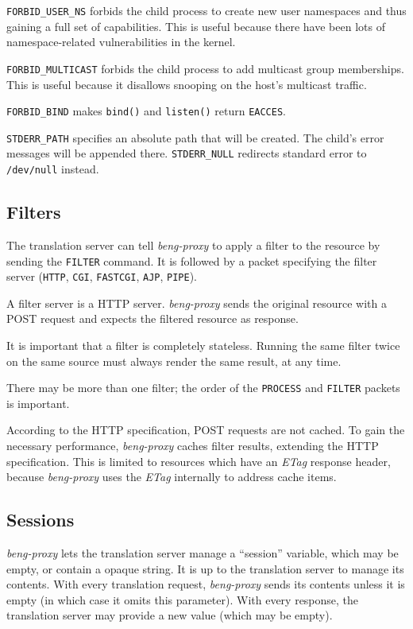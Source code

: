 \documentclass[a4paper,12pt]{article}
\begin{document}
\verb|FORBID_USER_NS| forbids the child process to create new user
namespaces and thus gaining a full set of capabilities.  This is
useful because there have been lots of namespace-related
vulnerabilities in the kernel.

\verb|FORBID_MULTICAST| forbids the child process to add multicast
group memberships.  This is useful because it disallows snooping on
the host's multicast traffic.

\verb|FORBID_BIND| makes \verb|bind()| and \verb|listen()| return
\verb|EACCES|.

\verb|STDERR_PATH| specifies an absolute path that will be created.
The child's error messages will be appended there.  \verb|STDERR_NULL|
redirects standard error to \texttt{/dev/null} instead.

\subsection{Filters}
\label{filter}

The translation server can tell \emph{beng-proxy} to apply a filter to
the resource by sending the \verb|FILTER| command.  It is followed
by a packet specifying the filter server (\verb|HTTP|,
\verb|CGI|, \verb|FASTCGI|, \verb|AJP|, \verb|PIPE|).

A filter server is a HTTP server.  \emph{beng-proxy} sends the
original resource with a POST request and expects the filtered
resource as response.

It is important that a filter is completely stateless.  Running the
same filter twice on the same source must always render the same
result, at any time.

There may be more than one filter; the order of the \verb|PROCESS|
and \verb|FILTER| packets is important.

According to the HTTP specification, POST requests are not cached.  To
gain the necessary performance, \emph{beng-proxy} caches filter
results, extending the HTTP specification.  This is limited to
resources which have an \emph{ETag} response header, because
\emph{beng-proxy} uses the \emph{ETag} internally to address cache
items.

\subsection{Sessions}
\label{sessions}

\emph{beng-proxy} lets the translation server manage a ``session''
variable, which may be empty, or contain a opaque string.  It is up to
the translation server to manage its contents.  With every translation
request, \emph{beng-proxy} sends its contents unless it is empty (in
which case it omits this parameter).  With every response, the
translation server may provide a new value (which may be empty).
\end{document}
